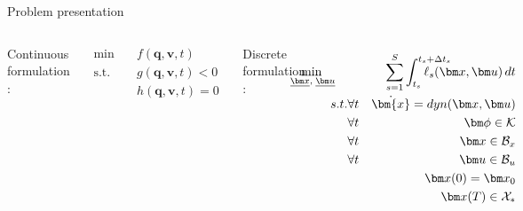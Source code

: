 \begin{frame}{Problem presentation}

\begin{columns}


Continuous formulation :

\begin{align*}
\text{min}  &\quad f({\bm q},{\bm v},t) \\
\text{s.t.} &\quad
g({\bm q},{\bm v},t) < 0 \nonumber \\
&\quad h({\bm q},{\bm v},t) = 0 \nonumber
\end{align*}

\vspace*{2.5cm}



Discrete formulation :

\begin{align*}
\hspace{-3em}	\underset{\substack{\hspace{0.2em} \underline{\bm x}, \; \underline{\bm u}} }{\min } \ \ \  
	& & \hspace{-3em} {\sum_{s=1}^S} \int_{t_{s}}^{t_{s}+\Delta t_s\hspace{-4em}} \ell_{s} (\bm x, \bm u) \, dt \\
	s.t. & \forall t & \dot{\bm{x}} = dyn(\bm x, \bm u) \\
	&  \forall t& \bm\phi \in \mathcal{K} \\
  &  \forall t& {\bm x} \in \mathcal{B}_x \\ 
  &  \forall t& {\bm u} \in \mathcal{B}_u \\ 
	& & \bm x(0) = \bm x_{0} \\
	& & \bm x(T) \in \mathcal{X}_*
\end{align*}

\end{columns}

\end{frame}


